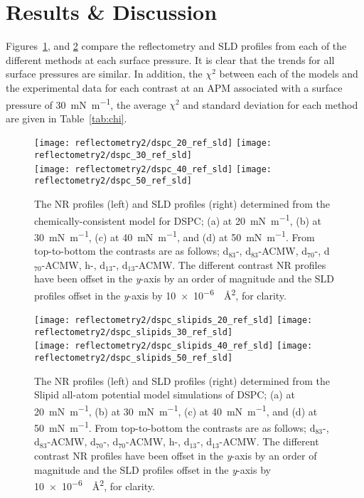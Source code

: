 \section{Results \& Discussion}
Figures~\ref{fig:dspcccref}, and \ref{fig:dspcmartref} compare the reflectometry and SLD profiles from each of the different methods at each surface pressure.
It is clear that the trends for all surface pressures are similar.
In addition, the $\chi^2$ between each of the models and the experimental data for each contrast at an APM associated with a surface pressure of \SI{30}{\milli\newton\per\meter}, the average $\chi^2$ and standard deviation for each method are given in Table~\ref{tab:chi}.
%
\begin{figure}
    \centering
    \texttt{[image: reflectometry2/dspc\_20\_ref\_sld]}
    \texttt{[image: reflectometry2/dspc\_30\_ref\_sld]}\\
    \texttt{[image: reflectometry2/dspc\_40\_ref\_sld]}
    \texttt{[image: reflectometry2/dspc\_50\_ref\_sld]}
    \caption{The NR profiles (left) and SLD profiles (right) determined from the chemically-consistent model for DSPC; (a) at \SI{20}{\milli\newton\per\meter}, (b) at \SI{30}{\milli\newton\per\meter}, (c) at \SI{40}{\milli\newton\per\meter}, and (d) at \SI{50}{\milli\newton\per\meter}. From top-to-bottom the contrasts are as follows; d${_83}$-, d${_83}$-ACMW, d${_70}$-, d${_70}$-ACMW, h-, d${_13}$-, d${_13}$-ACMW. The different contrast NR profiles have been offset in the \emph{y}-axis by an order of magnitude and the SLD profiles offset in the \emph{y}-axis by \SI{10e-6}{\per\angstrom\squared}, for clarity.}
    \label{fig:dspcccref}
\end{figure}
%
%
\begin{figure}
    \centering
    \texttt{[image: reflectometry2/dspc\_slipids\_20\_ref\_sld]}
    \texttt{[image: reflectometry2/dspc\_slipids\_30\_ref\_sld]}\\
    \texttt{[image: reflectometry2/dspc\_slipids\_40\_ref\_sld]}
    \texttt{[image: reflectometry2/dspc\_slipids\_50\_ref\_sld]}
    \caption{The NR profiles (left) and SLD profiles (right) determined from the Slipid all-atom potential model simulations of DSPC; (a) at \SI{20}{\milli\newton\per\meter}, (b) at \SI{30}{\milli\newton\per\meter}, (c) at \SI{40}{\milli\newton\per\meter}, and (d) at \SI{50}{\milli\newton\per\meter}. From top-to-bottom the contrasts are as follows; d${_83}$-, d${_83}$-ACMW, d${_70}$-, d${_70}$-ACMW, h-, d${_13}$-, d${_13}$-ACMW. The different contrast NR profiles have been offset in the \emph{y}-axis by an order of magnitude and the SLD profiles offset in the \emph{y}-axis by \SI{10e-6}{\per\angstrom\squared}, for clarity.}
    \label{fig:dspcmartref}
\end{figure}

